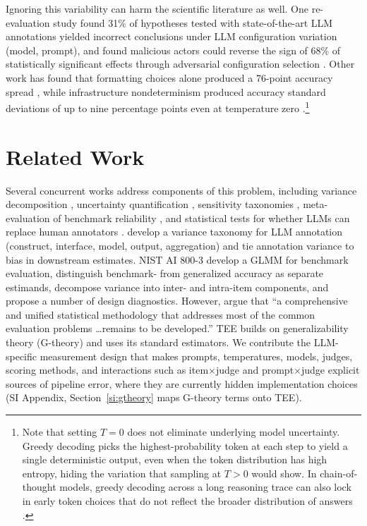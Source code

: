 \documentclass{article}
\begin{document}
Ignoring this variability can harm the scientific literature as well. One re-evaluation study found 31\% of hypotheses tested with state-of-the-art LLM annotations yielded incorrect conclusions under LLM configuration variation (model, prompt), and found malicious actors could reverse the sign of 68\% of statistically significant effects through adversarial configuration selection \citep{baumann2025llmhacking}. Other work has found that formatting choices alone produced a 76-point accuracy spread \citep{sclar2024sensitivity}, while infrastructure nondeterminism produced accuracy standard deviations of up to nine percentage points even at temperature zero \citep{yuan2025numerical}.\footnote{Note that setting $T = 0$ does not eliminate underlying model uncertainty. Greedy decoding picks the highest-probability token at each step to yield a single deterministic output, even when the token distribution has high entropy, hiding the variation that sampling at $T > 0$ would show. In chain-of-thought models, greedy decoding across a long reasoning trace can also lock in early token choices that do not reflect the broader distribution of answers \citep{renze2024temperature}.}

\section{Related Work}
\label{sec:related}

Several concurrent works address components of this problem, including variance decomposition \citep{haase2026withinmodel, wang2024measuring}, uncertainty quantification \citep{longjohn2025statistical}, sensitivity taxonomies \citep{romanou2026brittlebench}, meta-evaluation of benchmark reliability \citep{mcgregor2025benchrisk}, and statistical tests for whether LLMs can replace human annotators \citep{calderon2025alttest}. \citet{camuffo2026variance} develop a variance taxonomy for LLM annotation (construct, interface, model, output, aggregation) and tie annotation variance to bias in downstream estimates. NIST AI 800-3 \citep{keller2026nist} develop a GLMM for benchmark evaluation, distinguish benchmark- from generalized accuracy as separate estimands, decompose variance into inter- and intra-item components, and propose a number of design diagnostics. However, \citet{dobriban2025statistical} argue that ``a comprehensive and unified statistical methodology that addresses most of the common evaluation problems \ldots remains to be developed.'' TEE builds on generalizability theory (G-theory) \citep{cronbach1972dependability, brennan2001gtheory, shavelson1991gtheory, bayerl2007gtheory, song2025gtheory} and uses its standard estimators. We contribute the LLM-specific measurement design that makes prompts, temperatures, models, judges, scoring methods, and interactions such as item$\times$judge and prompt$\times$judge explicit sources of pipeline error, where they are currently hidden implementation choices (SI Appendix, Section~\ref{si:gtheory} maps G-theory terms onto TEE).
\end{document}
